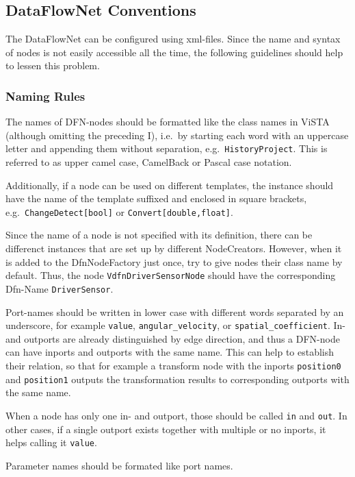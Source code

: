 \subsection{DataFlowNet Conventions}
The DataFlowNet can be configured using xml-files. Since the name and syntax of nodes is not easily accessible all the time, the following guidelines should help to lessen this problem.

\subsubsection{Naming Rules}

 The names of DFN-nodes should be formatted like the class names in ViSTA (although omitting the preceding I), i.e.\ by starting each word with an uppercase letter and appending them without separation, e.g.\ \texttt{HistoryProject}. 
This is referred to as upper camel case, CamelBack or Pascal case notation.

Additionally, if a node can be used on different templates, the instance should have the name of the template suffixed and enclosed in square brackets, e.g.\ \texttt{ChangeDetect[bool]} or \texttt{Convert[double,float]}.

Since the name of a node is not specified with its definition, there can be differenct instances that are set up by different NodeCreators.
However, when it is added to the DfnNodeFactory just once, try to give nodes their class name by default. 
Thus, the node \texttt{VdfnDriverSensorNode} should have the corresponding Dfn-Name \texttt{DriverSensor}.

 Port-names should be written in lower case with different words separated by an underscore, for example \texttt{value}, \texttt{angular\_velocity}, or \texttt{spatial\_coefficient}. 
In- and outports are already distinguished by edge direction, and thus a DFN-node can have inports and outports with the same name. 
This can help to establish their relation, so that for example a transform node with the inports \texttt{position0} and \texttt{position1} outputs the transformation results to corresponding outports with the same name.

When a node has only one in- and outport, those should be called \texttt{in} and \texttt{out}.
In other cases, if a single outport exists together with multiple or no inports, it helps calling it \texttt{value}.

 Parameter names should be formated like port names.

